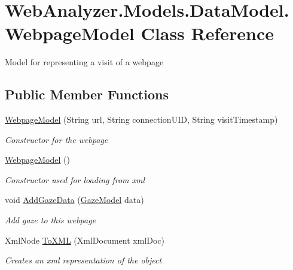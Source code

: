 \hypertarget{class_web_analyzer_1_1_models_1_1_data_model_1_1_webpage_model}{}\section{Web\+Analyzer.\+Models.\+Data\+Model.\+Webpage\+Model Class Reference}
\label{class_web_analyzer_1_1_models_1_1_data_model_1_1_webpage_model}


Model for representing a visit of a webpage  


\subsection*{Public Member Functions}
\begin{DoxyCompactItemize}
\item 
\hyperlink{class_web_analyzer_1_1_models_1_1_data_model_1_1_webpage_model_a2f7f76f4128b22b839f8858d40413067}{Webpage\+Model} (String url, String connection\+U\+I\+D, String visit\+Timestamp)
\begin{DoxyCompactList}\small\item\em Constructor for the webpage \end{DoxyCompactList}\item 
\hyperlink{class_web_analyzer_1_1_models_1_1_data_model_1_1_webpage_model_a613cfd755d739701df6cd2b05190d72f}{Webpage\+Model} ()
\begin{DoxyCompactList}\small\item\em Constructor used for loading from xml \end{DoxyCompactList}\item 
void \hyperlink{class_web_analyzer_1_1_models_1_1_data_model_1_1_webpage_model_a7169078e11bdd8867dc0f507c9a65b9e}{Add\+Gaze\+Data} (\hyperlink{class_web_analyzer_1_1_models_1_1_data_model_1_1_gaze_model}{Gaze\+Model} data)
\begin{DoxyCompactList}\small\item\em Add gaze to this webpage \end{DoxyCompactList}\item 
Xml\+Node \hyperlink{class_web_analyzer_1_1_models_1_1_data_model_1_1_webpage_model_a056bc9895b2a1c83631c24d100353ef2}{To\+X\+M\+L} (Xml\+Document xml\+Doc)
\begin{DoxyCompactList}\small\item\em Creates an xml representation of the object \end{DoxyCompactList}\item 

\end{DoxyCompactItemize}
